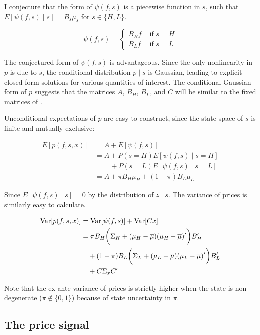 \documentclass{article}
\begin{document}
I conjecture that the form of $\psi(f, s)$ is a piecewise function in $s$, such that $E[\psi(f, s) \mid s] = B_s \mu_s$ for $s \in \{H, L\}$.

$$
\psi(f, s) = \begin{cases}
    B_H f & \text{ if } s=H \\
    B_L f & \text{ if } s=L
\end{cases}
$$

\noindent The conjectured form of $\psi(f, s)$ is advantageous. Since the only nonlinearity in $p$ is due to $s$, the conditional distribution $p \mid s$ is Gaussian, leading to explicit closed-form solutions for various quantities of interest. The conditional Gaussian form of $p$ suggests that the matrices $A$, $B_H$, $B_L$, and $C$ will be similar to the fixed matrices of \textcite{kacperczyk_rational_2016}.

Unconditional expectations of $p$ are easy to construct, since the state space of $s$ is finite and mutually exclusive:

\begin{align}
    E[p(f, s, x)] &= A + E[\psi(f,s)] \nonumber\\
    &= A + P(s=H) E[\psi(f,s) \mid s = H] \nonumber\\
    &\qquad\, + P(s=L) E[\psi(f,s) \mid s = L] \nonumber\\
    &= A + \pi B_H \mu_H + (1-\pi) B_L \mu_L
\end{align}

\noindent Since $E[\psi(f,s) \mid s]=0$ by the distribution of $z \mid s$. The variance of prices is similarly easy to calculate.

\begin{align}
    \text{Var}[p(f, s, x)] &= \text{Var}[\psi(f, s)] + \text{Var}[C x] \\
                     &= \pi  B_H \bigg(\Sigma_H + (\mu_H - \overline{\mu})(\mu_H - \overline{\mu})' \bigg) B_H' \\
                     &\quad+ (1-\pi) B_L \bigg(\Sigma_L + (\mu_L - \overline{\mu})(\mu_L - \overline{\mu})' \bigg) B_L' \\
                     &\quad+ C \Sigma_x C'
\end{align}

Note that the ex-ante variance of prices is strictly higher when the state is non-degenerate ($\pi \notin \{0, 1\}$) because of state uncertainty in $\pi$.

\subsection{The price signal}
\end{document}

